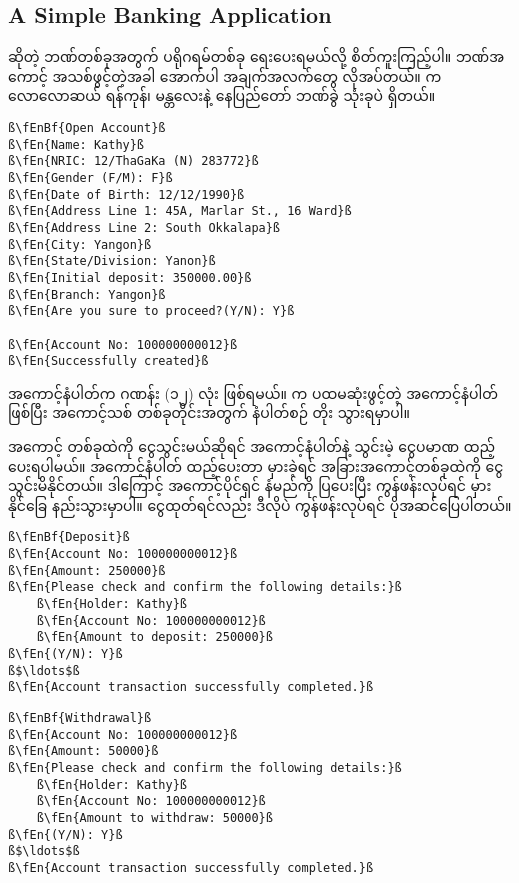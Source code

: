 \subsection*{A Simple Banking Application}
 ဆိုတဲ့ ဘဏ်တစ်ခုအတွက် ပရိုဂရမ်တစ်ခု ရေးပေးရမယ်လို့ စိတ်ကူးကြည့်ပါ။ ဘဏ်အကောင့် အသစ်ဖွင့်တဲ့အခါ အောက်ပါ အချက်အလက်တွေ လိုအပ်တယ်။  က လောလောဆယ် ရန်ကုန်၊ မန္တလေးနဲ့ နေပြည်တော် ဘဏ်ခွဲ သုံးခုပဲ ရှိတယ်။ 
%
\begin{verbatim}
ß\fEnBf{Open Account}ß
ß\fEn{Name: Kathy}ß
ß\fEn{NRIC: 12/ThaGaKa (N) 283772}ß
ß\fEn{Gender (F/M): F}ß
ß\fEn{Date of Birth: 12/12/1990}ß
ß\fEn{Address Line 1: 45A, Marlar St., 16 Ward}ß
ß\fEn{Address Line 2: South Okkalapa}ß
ß\fEn{City: Yangon}ß
ß\fEn{State/Division: Yanon}ß
ß\fEn{Initial deposit: 350000.00}ß
ß\fEn{Branch: Yangon}ß
ß\fEn{Are you sure to proceed?(Y/N): Y}ß

ß\fEn{Account No: 100000000012}ß
ß\fEn{Successfully created}ß
\end{verbatim}
%
အကောင့်နံပါတ်က ဂဏန်း (၁၂) လုံး ဖြစ်ရမယ်။  က ပထမဆုံးဖွင့်တဲ့ အကောင့်နံပါတ်  ဖြစ်ပြီး အကောင့်သစ် တစ်ခုတိုင်းအတွက် နံပါတ်စဉ် တိုး သွားရမှာပါ။

အကောင့် တစ်ခုထဲကို ငွေသွင်းမယ်ဆိုရင် အကောင့်နံပါတ်နဲ့ သွင်းမဲ့ ငွေပမာဏ ထည့်ပေးရပါမယ်။ အကောင့်နံပါတ် ထည့်ပေးတာ မှားခဲ့ရင် အခြားအကောင့်တစ်ခုထဲကို ငွေသွင်းမိနိုင်တယ်။ ဒါကြောင့် အကောင့်ပိုင်ရှင် နံမည်ကို ပြပေးပြီး ကွန်ဖန်းလုပ်ရင် မှားနိုင်ခြေ နည်းသွားမှာပါ။ ငွေထုတ်ရင်လည်း ဒီလိုပဲ ကွန်ဖန်းလုပ်ရင် ပိုအဆင်ပြေပါတယ်။

%
\begin{verbatim}
ß\fEnBf{Deposit}ß
ß\fEn{Account No: 100000000012}ß
ß\fEn{Amount: 250000}ß
ß\fEn{Please check and confirm the following details:}ß
    ß\fEn{Holder: Kathy}ß
    ß\fEn{Account No: 100000000012}ß
    ß\fEn{Amount to deposit: 250000}ß
ß\fEn{(Y/N): Y}ß 
ß$\ldots$ß
ß\fEn{Account transaction successfully completed.}ß
\end{verbatim}
%

%
\begin{verbatim}
ß\fEnBf{Withdrawal}ß
ß\fEn{Account No: 100000000012}ß
ß\fEn{Amount: 50000}ß
ß\fEn{Please check and confirm the following details:}ß
    ß\fEn{Holder: Kathy}ß
    ß\fEn{Account No: 100000000012}ß
    ß\fEn{Amount to withdraw: 50000}ß
ß\fEn{(Y/N): Y}ß 
ß$\ldots$ß
ß\fEn{Account transaction successfully completed.}ß
\end{verbatim}
%

